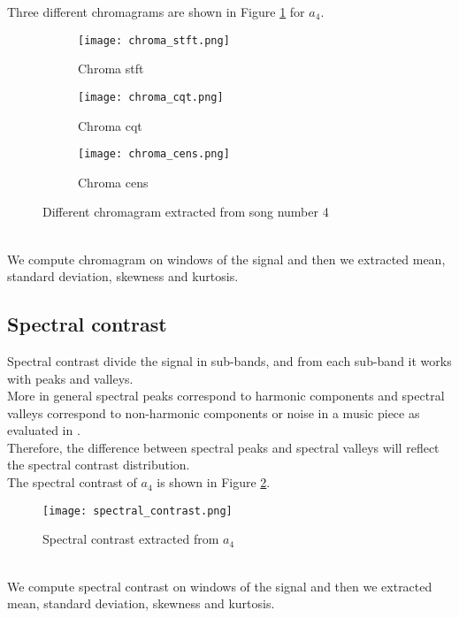 Three different chromagrams are shown in Figure \ref{fig:chroma} for $a_4$.
\begin{figure}[h]
    \centering
    \begin{subfigure}{{\textwidth}}
    		\texttt{[image: chroma\_stft.png]}
    		\caption{Chroma stft}
    \end{subfigure}
    \begin{subfigure}{\textwidth}
    		\texttt{[image: chroma\_cqt.png]} 
    		\caption{Chroma cqt}
    \end{subfigure}
    \begin{subfigure}{\textwidth}
    		\texttt{[image: chroma\_cens.png]} 
    		\caption{Chroma cens}
    \end{subfigure}
    \caption{Different chromagram extracted from song number 4}
    \label{fig:chroma}
\end{figure}
\\
We compute chromagram on windows of the signal and then we extracted mean, standard deviation, skewness and kurtosis.

\subsection{Spectral contrast}
Spectral contrast divide the signal in sub-bands, and from each sub-band it works with peaks and valleys.
\\
More in general spectral peaks correspond to harmonic components and spectral valleys correspond to non-harmonic components or noise in a music piece as evaluated in \cite{jiang2002music}.
\\
Therefore, the difference between spectral peaks and spectral valleys will reflect the spectral contrast distribution.
\\
The spectral contrast of $a_4$ is shown in Figure \ref{fig:spectral_contrast}.
\begin{figure}[h]
    \centering
    \texttt{[image: spectral\_contrast.png]} 
	\caption{Spectral contrast extracted from $a_4$}
    \label{fig:spectral_contrast}
\end{figure}
\\
We compute spectral contrast on windows of the signal and then we extracted mean, standard deviation, skewness and kurtosis.

